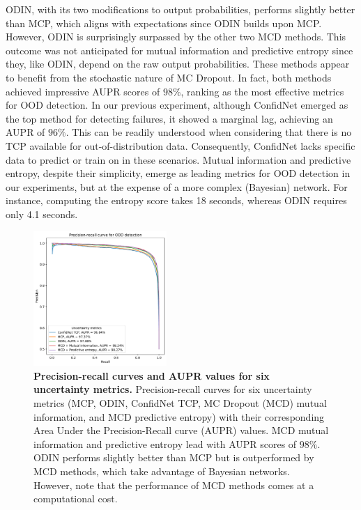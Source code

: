 ODIN, with its two modifications to output probabilities, performs slightly better than MCP, which aligns with expectations since ODIN builds upon MCP. However, ODIN is surprisingly surpassed by the other two MCD methods. This outcome was not anticipated for mutual information and predictive entropy since they, like ODIN, depend on the raw output probabilities. These methods appear to benefit from the stochastic nature of MC Dropout. In fact, both methods achieved impressive AUPR scores of $98\%$, ranking as the most effective metrics for OOD detection. In our previous experiment, although ConfidNet emerged as the top method for detecting failures, it showed a marginal lag, achieving an AUPR of $96\%$. This can be readily understood when considering that there is no TCP available for out-of-distribution data. Consequently, ConfidNet lacks specific data to predict or train on in these scenarios. Mutual information and predictive entropy, despite their simplicity, emerge as leading metrics for OOD detection in our experiments, but at the expense of a more complex (Bayesian) network. For instance, computing the entropy score takes 18 seconds, whereas ODIN requires only 4.1 seconds.
\begin{figure}[H]
    \centering
    \includegraphics[width=0.45\textwidth]{OOD_aupr.pdf}
    \caption{\textbf{Precision-recall curves and AUPR values for six uncertainty metrics.} Precision-recall curves for six uncertainty metrics (MCP, ODIN, ConfidNet TCP, MC Dropout (MCD) mutual information, and MCD predictive entropy) with their corresponding Area Under the Precision-Recall curve (AUPR) values. MCD mutual information and predictive entropy lead with AUPR scores of $98\%$. ODIN performs slightly better than MCP but is outperformed by MCD methods, which take advantage of Bayesian networks. However, note that the performance of MCD methods comes at a computational cost.}
    \label{fig:OOD_aupr}
\end{figure}


